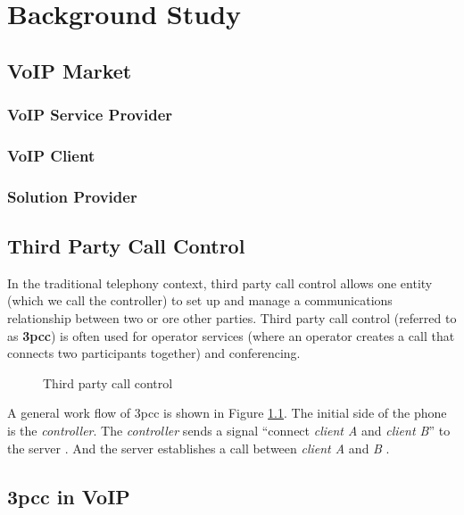 \chapter{Background Study}
\label{sec:BackgroundStudy}

\section{VoIP Market}
\label{sec:BackgroundStudy:VoIPMarket}


\subsection{VoIP Service Provider}
\label{sec:BackgroundStudy:VoIPMarket:VoIPServiceProvider}

\subsection{VoIP Client}
\label{sec:BackgroundStudy:VoIPMarket:VoIPClient}

\subsection{Solution Provider}
\label{sec:BackgroundStudy:VoIPMarket:SolutionProvider}



\section{Third Party Call Control}
\label{sec:BackgroundStudy:ThirdPartyCallControl}

In the traditional telephony context, third party call control allows one entity (which we call the controller) to set up and manage a communications relationship between two or ore other parties.  Third party call control (referred to as \textbf{3pcc}\label{sym:3pcc}) is often used for operator services (where an operator creates a call that connects two participants together) and conferencing.\cite{RFC3725}

\begin{figure}
\centering
{}
\caption{Third party call control}
\label{fig:ThirdPartyCallControl}
\end{figure}

A general work flow of 3pcc is shown in Figure \ref{fig:ThirdPartyCallControl}. The initial side of the phone is the \textit{controller}. The \textit{controller} sends a signal ``connect \textit{client A} and \textit{client B}'' to the server . And the server establishes a call between \textit{client A} and \textit{B} .

\section{3pcc in VoIP}
\label{sec:BackgroundStudy:3pccInVoIP}


